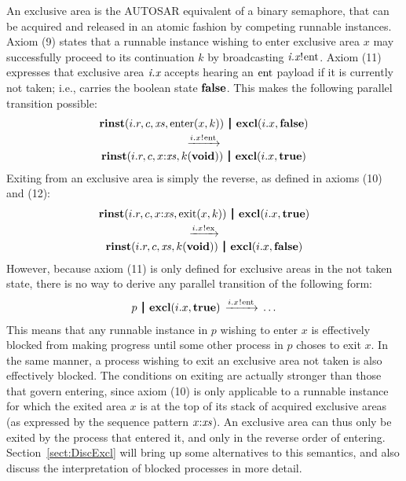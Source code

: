 \documentclass[twocolumn]{article}
\begin{document}
An exclusive area is the AUTOSAR equivalent of a binary semaphore, that can be acquired and released in an atomic fashion by competing runnable instances. Axiom (9) states that a runnable instance wishing to enter exclusive area $x$ may successfully proceed to its continuation $k$ by broadcasting $\say{\Tx x i}{\Tent}$. Axiom (11) expresses that exclusive area $\Tx x i$ accepts hearing an ${\Tent}$ payload if it is currently not taken; i.e., carries the boolean state $\Tfalse$. This makes the following parallel transition possible:
$$
\begin{array}{c}
	\Trinst {i.r} c \Xs {\TrteEnter x k}
	\Opar
	\Texcl {i.x} \Tfalse \vspace{0.6ex} \\ 
	\red{\say {i.x} \Tent} \\
	\Trinst{i.r} c {\Tcons x \Xs} {\Tap k \Tvoid}
	\Opar
	\Texcl {i.x} \Ttrue
\end{array}
$$
Exiting from an exclusive area is simply the reverse, as defined in axioms (10) and (12):
$$
\begin{array}{c}
	\Trinst {i.r} c {\Tcons x \Xs} {\TrteExit x k}
	\Opar
	\Texcl {i.x} \Ttrue \vspace{0.6ex} \\ 
	\red{\say {i.x} \Tex} \\
	\Trinst{i.r} c \Xs {\Tap k \Tvoid}
	\Opar
	\Texcl {i.x} \Tfalse
\end{array}
$$
However, because axiom (11) is only defined for exclusive areas in the not taken state, there is no way to derive any parallel transition of the following form:
$$
\begin{array}{c}
	p \Opar {\Texcl {i.x} \Ttrue} \red{\say{i.x}{\Tent}} \ldots \\
\end{array}
$$
This means that any runnable instance in $p$ wishing to enter $x$ is effectively blocked from making progress until some other process in $p$ choses to exit $x$. In the same manner, a process wishing to exit an exclusive area not taken is also effectively blocked. The conditions on exiting are actually stronger than those that govern entering, since axiom (10) is only applicable to a runnable instance for which the exited area $x$ is at the top of its stack of acquired exclusive areas (as expressed by the sequence pattern $\Tcons x \Xs$). An exclusive area can thus only be exited by the process that entered it, and only in the reverse order of entering. Section~\ref{sect:DiscExcl} will bring up some alternatives to this semantics, and also discuss the interpretation of blocked processes in more detail.
\end{document}
